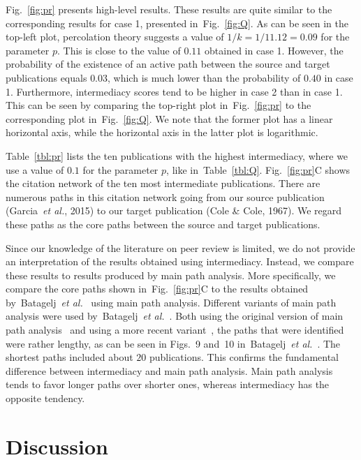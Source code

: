 \documentclass[9pt,twocolumn,twoside,lineno]{pnas-alt}
\theoremstyle{definition}
\newcommand{\figref}[1]{Fig.~\ref{fig:#1}\xspace}
\newcommand{\subfigref}[2]{Fig.~\ref{fig:#1}#2\xspace}
\newcommand{\tblref}[1]{Table~\ref{tbl:#1}\xspace}
\renewcommand{\etal}{~\emph{et al.}\xspace}
\begin{document}
\figref{pr} presents high-level results. These results are quite similar to the corresponding results for case 1, presented in~\figref{Q}. As can be seen in the top-left plot, percolation theory suggests a value of $1 / k = 1 / 11.12 = 0.09$ for the parameter $p$. This is close to the value of $0.11$ obtained in case 1. However, the probability of the existence of an active path between the source and target publications equals $0.03$, which is much lower than the probability of $0.40$ in case 1. Furthermore, intermediacy scores tend to be higher in case 2 than in case 1. This can be seen by comparing the top-right plot in~\figref{pr} to the corresponding plot in~\figref{Q}. We note that the former plot has a linear horizontal axis, while the horizontal axis in the latter plot is logarithmic.

\tblref{pr} lists the ten publications with the highest intermediacy, where we use a value of $0.1$ for the parameter $p$, like in~\tblref{Q}. \subfigref{pr}{C} shows the citation network of the ten most intermediate publications. There are numerous paths in this citation network going from our source publication (Garcia\etal, 2015) to our target publication (Cole \& Cole, 1967). We regard these paths as the core paths between the source and target publications.

Since our knowledge of the literature on peer review is limited, we do not provide an interpretation of the results obtained using intermediacy. Instead, we compare these results to results produced by main path analysis. More specifically, we compare the core paths shown in~\subfigref{pr}{C} to the results obtained by~Batagelj\etal~\cite{Batagelj2017} using main path analysis. Different variants of main path analysis were used by~Batagelj\etal~\cite{Batagelj2017}. Both using the original version of main path analysis~\cite{Hummon1989} and using a more recent variant~\cite{Liu2012}, the paths that were identified were rather lengthy, as can be seen in Figs.~9 and~10 in~Batagelj\etal~\cite{Batagelj2017}. The shortest paths included about $20$ publications. This confirms the fundamental difference between intermediacy and main path analysis. Main path analysis tends to favor longer paths over shorter ones, whereas intermediacy has the opposite tendency.

%
%

\section*{\label{sec:discussion}Discussion}
\end{document}
